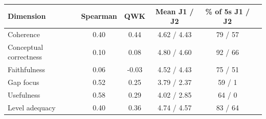 \begin{tabular}{lccccc}
\toprule
Dimension & Spearman & QWK & Mean J1 / J2 & \% of 5s J1 / J2 \\
\midrule
Coherence & 0.40 & 0.44 & 4.62 / 4.43 & 79 / 57 \\
Conceptual correctness & 0.10 & 0.08 & 4.80 / 4.60 & 92 / 66 \\
Faithfulness & 0.06 & -0.03 & 4.52 / 4.43 & 75 / 51 \\
Gap focus & 0.52 & 0.25 & 3.79 / 2.37 & 59 / 1 \\
Usefulness & 0.58 & 0.29 & 4.02 / 2.85 & 64 / 0 \\
Level adequacy & 0.40 & 0.36 & 4.74 / 4.57 & 83 / 64 \\
\bottomrule
\end{tabular}